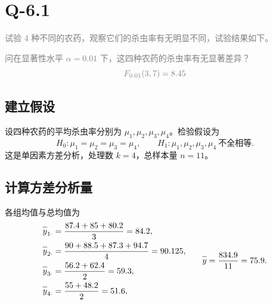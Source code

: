 \documentclass{article}
\newcommand{\barline}[1]{\overline{#1\rule{0pt}{1.5ex}}}
\begin{document}
\section{Q-6.1}

\textcolor{gray}{试验 4 种不同的农药，观察它们的杀虫率有无明显不同，试验结果如下。}

\begin{center}
    \setlength{\tabcolsep}{18pt}
    \renewcommand{\arraystretch}{1.25}
\end{center}

\textcolor{gray}{问在显著性水平 $\alpha=0.01$ 下，这四种农药的杀虫率有无显著差异？}
\[
    \textcolor{gray}{F_{0.01}(3,7)=8.45}
\]

\subsection{建立假设}

设四种农药的平均杀虫率分别为 $\mu_1,\mu_2,\mu_3,\mu_4$。检验假设为
\[
    H_0:\mu_1=\mu_2=\mu_3=\mu_4,\qquad
    H_1:\mu_1,\mu_2,\mu_3,\mu_4\ \text{不全相等}.
\]
这是单因素方差分析，处理数 $k=4$，总样本量 $n=11$。

\subsection{计算方差分析量}

各组均值与总均值为
\[
\begin{aligned}
    \barline{y}_{1\cdot}&=\dfrac{87.4+85+80.2}{3}=84.2,\\
    \barline{y}_{2\cdot}&=\dfrac{90+88.5+87.3+94.7}{4}=90.125,\\
    \barline{y}_{3\cdot}&=\dfrac{56.2+62.4}{2}=59.3,\\
    \barline{y}_{4\cdot}&=\dfrac{55+48.2}{2}=51.6,
\end{aligned}
\qquad
    \barline{y}=\dfrac{834.9}{11}=75.9 .
\]
\end{document}

